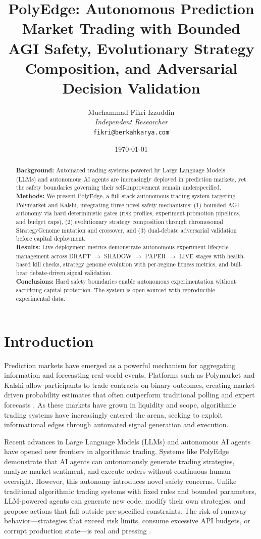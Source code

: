 \documentclass[11pt]{article}
\title{PolyEdge: Autonomous Prediction Market Trading with Bounded AGI Safety, Evolutionary Strategy Composition, and Adversarial Decision Validation}
\author{Muchammad Fikri Izzuddin\\
\textit{Independent Researcher}\\
\texttt{fikri@berkahkarya.com}}
\date{\today}
\begin{document}
\maketitle

\begin{abstract}
\textbf{Background:} Automated trading systems powered by Large Language Models (LLMs) and autonomous AI agents are increasingly deployed in prediction markets, yet the safety boundaries governing their self-improvement remain underspecified.\\
\textbf{Methods:} We present PolyEdge, a full-stack autonomous trading system targeting Polymarket and Kalshi, integrating three novel safety mechanisms: (1) bounded AGI autonomy via hard deterministic gates (risk profiles, experiment promotion pipelines, and budget caps), (2) evolutionary strategy composition through chromosomal StrategyGenome mutation and crossover, and (3) dual-debate adversarial validation before capital deployment.\\
\textbf{Results:} Live deployment metrics demonstrate autonomous experiment lifecycle management across DRAFT $\rightarrow$ SHADOW $\rightarrow$ PAPER $\rightarrow$ LIVE stages with health-based kill checks, strategy genome evolution with per-regime fitness metrics, and bull-bear debate-driven signal validation.\\
\textbf{Conclusions:} Hard safety boundaries enable autonomous experimentation without sacrificing capital protection. The system is open-sourced with reproducible experimental data.
\end{abstract}

\section{Introduction}\label{sec:intro}

Prediction markets have emerged as a powerful mechanism for aggregating information and forecasting real-world events. Platforms such as Polymarket and Kalshi allow participants to trade contracts on binary outcomes, creating market-driven probability estimates that often outperform traditional polling and expert forecasts \citep{hanson2003combinatorial}. As these markets have grown in liquidity and scope, algorithmic trading systems have increasingly entered the arena, seeking to exploit informational edges through automated signal generation and execution.

Recent advances in Large Language Models (LLMs) and autonomous AI agents have opened new frontiers in algorithmic trading. Systems like PolyEdge demonstrate that AI agents can autonomously generate trading strategies, analyze market sentiment, and execute orders without continuous human oversight. However, this autonomy introduces novel safety concerns. Unlike traditional algorithmic trading systems with fixed rules and bounded parameters, LLM-powered agents can generate new code, modify their own strategies, and propose actions that fall outside pre-specified constraints. The risk of runaway behavior---strategies that exceed risk limits, consume excessive API budgets, or corrupt production state---is real and pressing \citep{amodei2016concrete, russell2020human}.
\end{document}
